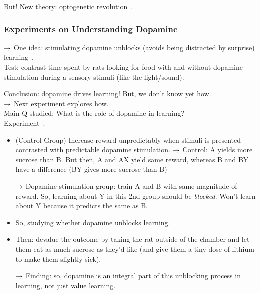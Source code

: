 But! New theory: optogenetic revolution~\cite{roesch2007dopamine}. \\

\subsubsection{Experiments on Understanding Dopamine}

$\rightarrow$ One idea: stimulating dopamine unblocks (avoids being distracted by surprise) learning~\cite{steinberg2013causal}. \\

Test: contrast time spent by rats looking for food with and without dopamine stimulation during a sensory stimuli (like the light/sound).


Conclusion: dopamine drives learning! But, we don't know yet how. \\

$\rightarrow$ Next experiment explores how. \\

Main Q studied: What is the role of dopamine in learning? \\

Experiment~\cite{keiflin2019ventral}:
\begin{itemize}
    \item (Control Group) Increase reward unpredictably when stimuli is presented contrasted with predictable dopamine stimulation.
    $\rightarrow$ Control: A yields more sucrose than B. But then, A and AX yield same reward, whereas B and BY have a difference (BY gives more sucrose than B)
    
    $\rightarrow$ Dopamine stimulation group: train A and B with same magnitude of reward. So, learning about Y in this 2nd group should be {\it blocked}. Won't learn about Y because it predicts the same as B.
    
    \item So, studying whether dopamine unblocks learning.
    
    \item Then: devalue the outcome by taking the rat outside of the chamber and let them eat as much sucrose as they'd like (and give them a tiny dose of lithium to make them slightly sick).
    
    $\rightarrow$ Finding: so, dopamine is an integral part of this unblocking process in learning, not just value learning.
\end{itemize}

